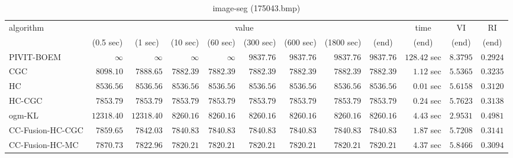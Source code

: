 \begin{table}[H]
\scriptsize
\centering
\caption{image-seg (175043.bmp)}
\label{tab:anytimetable-image-seg-175043.bmp}
\begin{tabular}{lrrrrrrrrrrr}
\toprule
           algorithm &                                   \multicolumn{8}{c}{value} & \multicolumn{1}{c}{time}    & \multicolumn{1}{c}{VI}  & \multicolumn{1}{c}{RI} \\  
\cmidrule(lr){2-9}\cmidrule(lr){10-10} \cmidrule(lr){11-11} \cmidrule(lr){12-12}   
                     & \multicolumn{1}{c}{(0.5 sec)} & \multicolumn{1}{c}{(1 sec)} & \multicolumn{1}{c}{(10 sec)} & \multicolumn{1}{c}{(60 sec)} & \multicolumn{1}{c}{(300 sec)} & \multicolumn{1}{c}{(600 sec)} & \multicolumn{1}{c}{(1800 sec)} & \multicolumn{1}{c}{(end)} & \multicolumn{1}{c}{(end)}    & \multicolumn{1}{c}{(end)}   & \multicolumn{1}{c}{(end)}  \\ \midrule 
          PIVIT-BOEM & $\infty$ & $\infty$ & $\infty$ & $\infty$ & $      9837.76$ & $      9837.76$ & $      9837.76$ & $      9837.76$ & $       128.42$ sec    & $       8.3795$  & $       0.2924$ \\ 
                 CGC & $      8098.10$ & $      7888.65$ & $      7882.39$ & $      7882.39$ & $      7882.39$ & $      7882.39$ & $      7882.39$ & $      7882.39$ & $         1.12$ sec    & $       5.5365$  & $       0.3235$ \\ 
                  HC & $      8536.56$ & $      8536.56$ & $      8536.56$ & $      8536.56$ & $      8536.56$ & $      8536.56$ & $      8536.56$ & $      8536.56$ & $         0.01$ sec    & $       5.6158$  & $       0.3120$ \\ 
              HC-CGC & $      7853.79$ & $      7853.79$ & $      7853.79$ & $      7853.79$ & $      7853.79$ & $      7853.79$ & $      7853.79$ & $      7853.79$ & $         0.24$ sec    & $       5.7623$  & $       0.3138$ \\ 
              ogm-KL & $     12318.40$ & $     12318.40$ & $      8260.16$ & $      8260.16$ & $      8260.16$ & $      8260.16$ & $      8260.16$ & $      8260.16$ & $         4.43$ sec    & $       2.9531$  & $       0.4981$ \\ 
    CC-Fusion-HC-CGC & $      7859.65$ & $      7842.03$ & $      7840.83$ & $      7840.83$ & $      7840.83$ & $      7840.83$ & $      7840.83$ & $      7840.83$ & $         1.87$ sec    & $       5.7208$  & $       0.3141$ \\ 
     CC-Fusion-HC-MC & $      7870.73$ & $      7822.96$ & $      7820.21$ & $      7820.21$ & $      7820.21$ & $      7820.21$ & $      7820.21$ & $      7820.21$ & $         4.37$ sec    & $       5.8466$  & $       0.3094$ \\ 

\end{tabular}
\end{table}
